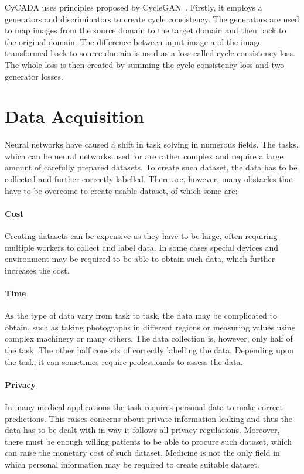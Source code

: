 \label{cyclegan}
CyCADA uses principles proposed by CycleGAN~\cite{CycleGAN}. Firstly, it employs a generators and discriminators to create cycle consistency. The generators are used to map images from the source domain to the target domain and then back to the original domain. The difference between input image and the image transformed back to source domain is used as a loss called cycle-consistency loss. The whole loss is then created by summing the cycle consistency loss and two generator losses.


\section{Data Acquisition}
Neural networks have caused a shift in task solving in numerous fields. The tasks, which can be neural networks used for are rather complex and require a large amount of carefully prepared datasets. To create such dataset, the data has to be collected and further correctly labelled. There are, however, many obstacles that have to be overcome to create usable dataset, of which some are:

\paragraph{Cost} Creating datasets can be expensive as they have to be large, often requiring multiple workers to collect and label data. In some cases special devices and environment may be required to be able to obtain such data, which further increases the cost.
\paragraph{Time} As the type of data vary from task to task, the data may be complicated to obtain, such as taking photographs in different regions or measuring values using complex machinery or many others. The data collection is, however, only half of the task. The other half consists of correctly labelling the data. Depending upon the task, it can sometimes require professionals to assess the data.
\paragraph{Privacy} In many medical applications the task requires personal data to make correct predictions. This raises concerns about private information leaking and thus the data has to be dealt with in way it follows all privacy regulations. Moreover, there must be enough willing patients to be able to procure such dataset, which can raise the monetary cost of such dataset. Medicine is not the only field in which personal information may be required to create suitable dataset.
